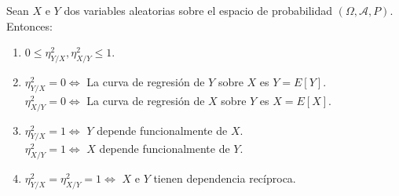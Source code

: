 \begin{prop}
    Sean $X$ e $Y$ dos variables aleatorias sobre el espacio de probabilidad $(\Omega, \mathcal{A}, P)$. Entonces:
    \begin{enumerate}
        \item $0\leq \eta_{Y/X}^2, \eta_{X/Y}^2 \leq 1$.
        \item $\eta_{Y/X}^2 = 0 \iff $ La curva de regresión de $Y$ sobre $X$ es $Y = E[Y]$.\\
        $\eta_{X/Y}^2 = 0 \iff $ La curva de regresión de $X$ sobre $Y$ es $X = E[X]$.
        \item $\eta_{Y/X}^2 = 1 \iff $ $Y$ depende funcionalmente de $X$.\\
        $\eta_{X/Y}^2 = 1 \iff $ $X$ depende funcionalmente de $Y$.
        \item $\eta_{Y/X}^2 = \eta_{X/Y}^2 = 1 \iff $ $X$ e $Y$ tienen dependencia recíproca.
    \end{enumerate}
\end{prop}
